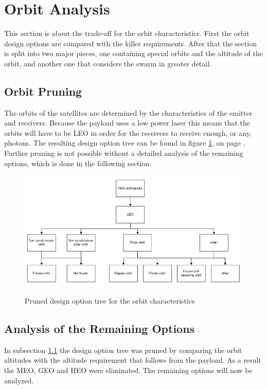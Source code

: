 \section{Orbit Analysis}
This section is about the trade-off for the orbit characteristics. First the orbit design options are compared with the killer requirements. After that the section is split into two major pieces, one containing special orbits and the altitude of the orbit, and another one that considers the swarm in greater detail.
\label{AnalOrb}

\subsection{Orbit Pruning}
\label{pruneOrbit}
The orbits of the satellites are determined by the characteristics of the emitter and receivers. Because the payload uses a low power laser this means that the orbits will have to be \ac{LEO} in order for the receivers to receive enough, or any, photons. The resulting design option tree can be found in figure \ref{fig:pruneOrbit}, on page \pageref{fig:pruneOrbit}. Further pruning is not possible without a detailed analysis of the remaining options, which is done in the following section.

\begin{figure}[b]
\centering
\includegraphics[width=1.0\textwidth, angle=0]{chapters/img/PrunedOrbit.jpg}
\label{fig:pruneOrbit}
\caption{Pruned design option tree for the orbit characteristics}
\end{figure}

\subsection{Analysis of the Remaining Options}
\label{AnalSpOrb}

In subsection \ref{pruneOrbit} the design option tree was pruned by comparing the orbit altitudes with the altitude requirement that follows from the payload. As a result the \acs{MEO}, \acs{GEO} and \acs{HEO} were eliminated. The remaining options will now be analyzed.

